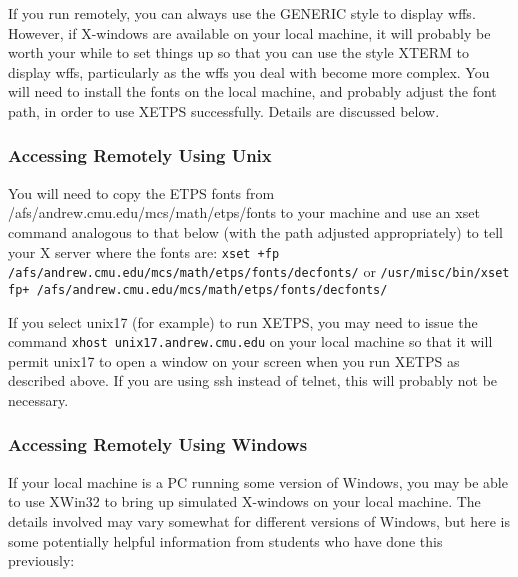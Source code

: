 \documentclass{article}
\begin{document}
If you run {\ETPS} remotely, you can always use the
GENERIC style to display wffs. However, if X-windows are available on
your local machine, it will probably be worth your while to set things up so
that you can use the style XTERM to display wffs, particularly as the
wffs you deal with become more complex. You will need to install the
fonts on the local machine, and probably adjust the font path, in
order to use XETPS successfully. Details are discussed below.


\subsubsection{Accessing {\ETPS} Remotely Using Unix}

You will need to copy the ETPS fonts from
/afs/andrew.cmu.edu/mcs/math/etps/fonts to your machine and use an
xset command analogous to that below (with the path adjusted
appropriately) to tell your X server where the fonts are: \newline{}
{\tt xset +fp /afs/andrew.cmu.edu/mcs/math/etps/fonts/decfonts/}\newline{}
or\newline{}
{\tt /usr/misc/bin/xset fp+ /afs/andrew.cmu.edu/mcs/math/etps/fonts/decfonts/}




If you select unix17 (for example) to run XETPS,
you may need to issue the command\newline{}
{\tt xhost unix17.andrew.cmu.edu}\newline{}
on your local machine  so that  it will permit unix17 to open a window on your screen
when you run XETPS as described above. If you are using ssh instead of
telnet, this will probably not be necessary.


\subsubsection{Accessing {\ETPS} Remotely Using Windows}


If your local machine is a PC running some version of Windows, you may
be able to use XWin32 to bring up simulated X-windows on your local machine.
The details involved may vary somewhat for different versions of
Windows, but here is some potentially helpful information from
students who have done this previously:
\end{document}
